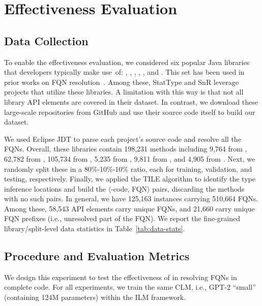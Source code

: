 \section{Effectiveness Evaluation}
\label{sec:effectiveness-eval}

\subsection{Data Collection}\label{sec:effectiveness-data}



To enable the effectiveness evaluation, we considered six popular Java libraries that developers typically make use~of: , , , , , and . This set has been used in prior works on FQN resolution~\cite{icse18, snr-icse22, prompt-ase22}. Among these, StatType\cite{icse18} and SnR\cite{snr-icse22} leverage projects that utilize these libraries. A limitation with this way is that not all library API elements are covered in their dataset. In contrast, we download these large-scale repositories from GitHub and use their source code itself to build our dataset.

We used Eclipse JDT to parse each project’s source code and resolve
all the FQNs.
Overall, these libraries contain 198,231 methods including 9,764 from
, 62,782 from , 105,734 from
, 5,235 from , 9,811 from
, and 4,905 from . Next, we randomly
split these in a 80\%-10\%-10\% ratio, each for training, validation,
and testing, respectively. Finally, we applied the TILE algorithm to
identify the type inference locations and build the
$\langle$\blank-code, FQN$\rangle$ pairs, discarding the methods with
no such pairs. In general, we have 125,163 instances carrying 510,664
FQNs. Among these, 58,543 API elements carry unique FQNs, and 21,660
carry unique FQN prefixes (i.e., unresolved part of the FQN). We
report the fine-grained library/split-level data statistics in
Table~\ref{tab:data-stats}.

\subsection{Procedure and Evaluation Metrics}\label{sec:effectiveness-eval-proc}
We design this experiment to test the effectiveness of \tool in resolving FQNs in complete code. For all experiments, we train the same CLM, i.e., GPT-2 “small” (containing 124M parameters) within the ILM framework.

